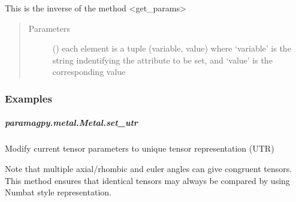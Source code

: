 \documentclass[a4paper,10pt,english]{sphinxmanual}
\begin{document}
\begin{fulllineitems}
\begin{fulllineitems}
\begin{fulllineitems}
This is the inverse of the method \textless{}get\_params\textgreater{}
\begin{quote}\begin{description}
\item[{Parameters}] \leavevmode
{} () \textendash{} each element is a tuple (variable, value) where ‘variable’
is the string indentifying the attribute to be set, and ‘value’
is the corresponding value

\end{description}\end{quote}
\subsubsection*{Examples}

%
\begin{sphinxVerbatim}[commandchars=\\\{\}]
  
\PYG{p}{[}\PYG{p}{]}
\end{sphinxVerbatim}

\end{fulllineitems}



\subparagraph{paramagpy.metal.Metal.set\_utr}
\label{\detokenize{reference/generated/paramagpy.metal.Metal.set_utr:paramagpy-metal-metal-set-utr}}\label{\detokenize{reference/generated/paramagpy.metal.Metal.set_utr::doc}}

\begin{fulllineitems}
\label{\detokenize{reference/generated/paramagpy.metal.Metal.set_utr:paramagpy.metal.Metal.set_utr}}
Modify current tensor parameters to unique tensor representation (UTR)

Note that multiple axial/rhombic and euler angles can give congruent
tensors.
This method ensures that identical tensors may always be compared
by using Numbat style representation.


\end{fulllineitems}
\end{fulllineitems}
\end{fulllineitems}
\end{document}
